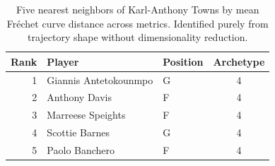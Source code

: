 \begin{table}[htbp]
  \centering\small
  \begin{tabular}{rllc}
    \toprule
    Rank & Player & Position & Archetype \\
    \midrule
    1 & Giannis Antetokounmpo & G & 4 \\
    2 & Anthony Davis & F & 4 \\
    3 & Marreese Speights & F & 4 \\
    4 & Scottie Barnes & G & 4 \\
    5 & Paolo Banchero & F & 4 \\
    \bottomrule
  \end{tabular}
  \caption{Five nearest neighbors of Karl-Anthony Towns by mean Fr\'{e}chet curve distance across metrics. Identified purely from trajectory shape without dimensionality reduction.}
  \label{tab:Karl_Anthony_Towns_frechet_curve_neighbors}
\end{table}


